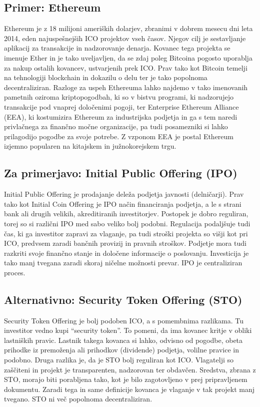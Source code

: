\documentclass[letterpaper, titlepage, freqn]{article}
\begin{document}
\subsection{Primer: Ethereum}

Ethereum je z 18 milijoni ameriških dolarjev, zbranimi v dobrem mesecu dni leta 2014, eden najuspešnejših ICO projektov vseh časov. Njegov cilj je sestavljanje aplikacij za transakcije in nadzorovanje denarja. Kovanec tega projekta se imenuje Ether in je tako uveljavljen, da se zdaj poleg Bitcoina pogosto uporablja za nakup ostalih kovancev, ustvarjenih prek ICO. Prav tako kot Bitcoin temelji na tehnologiji blockchain in dokazilu o delu ter je tako popolnoma decentraliziran. Razloge za uspeh Ethereuma lahko najdemo v tako imenovanih pametnih oziroma kriptopogodbah, ki so v bistvu programi, ki nadzorujejo transakcije pod vnaprej določenimi pogoji, ter Enterprise Ethereum Alliance (EEA), ki kostumizira Ethereum za industrijska podjetja in ga s tem naredi privlačnega za finančno močne organizacije, pa tudi posamezniki si lahko prilagodijo pogodbe za svoje potrebe. Z vzponom EEA je postal Ethereum izjemno popularen na kitajskem in južnokorejskem trgu.\\

\subsection{Za primerjavo: Initial Public Offering (IPO)}

Initial Public Offering je prodajanje deleža podjetja javnosti (delničarji). Prav tako kot Initial Coin Offering je IPO način financiranja podjetja, a le s strani bank ali drugih velikih, akreditiranih investitorjev. Postopek je dobro reguliran, torej so si različni IPO med sabo veliko bolj podobni. Regulacija podaljšuje tudi čas, ki ga investitor zapravi za vlaganje, pa tudi stroški projekta so višji kot pri ICO, predvsem zaradi bančnih provizij in pravnih stroškov. Podjetje mora tudi razkriti svoje finančno stanje in določene informacije o poslovanju. Investicija je tako manj tvegana zaradi skoraj ničelne možnosti prevar. IPO je centraliziran proces.\\

\subsection{Alternativno: Security Token Offering (STO)}

Security Token Offering je bolj podoben ICO, a s pomembnima razlikama. Tu investitor vedno kupi “security token”. To pomeni, da ima kovanec kritje v obliki lastniških pravic. Lastnik takega kovanca si lahko, odvisno od pogodbe, obeta prihodke iz premoženja ali prihodkov (dividende) podjetja, volilne pravice in podobno. Druga razlika je, da je STO bolj reguliran kot ICO. Vlagatelji so zaščiteni in projekt je transparenten, nadzorovan ter obdavčen. Sredstva, zbrana z STO, morajo biti porabljena tako, kot je bilo zagotovljeno v prej pripravljenem dokumentu. Zaradi tega in same definicije kovanca je vlaganje v tak projekt manj tvegano. STO ni več popolnoma decentraliziran.\\
\end{document}
